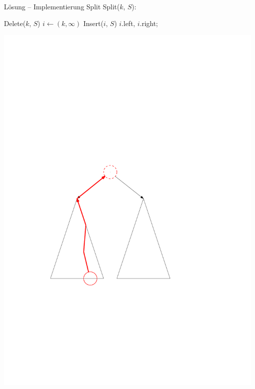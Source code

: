 \documentclass[t]{beamer}
\theoremstyle{plain}
\begin{document}
\begin{frame}{Lösung -- Implementierung Split}
    \vspace{2em}
    Split($k$, $S$):
    \vspace{.5em}
    \begin{algorithm}[H]
        Delete($k$, $S$) 
        $i \gets (k, \infty)$ \;
        Insert($i$, $S$) \;
        \Return $i$.left, $i$.right;
    \end{algorithm}
    \hfill\includegraphics[width=.4\textwidth]{img/Impl_Split.pdf}\hspace{2em}
\end{frame}
\end{document}
